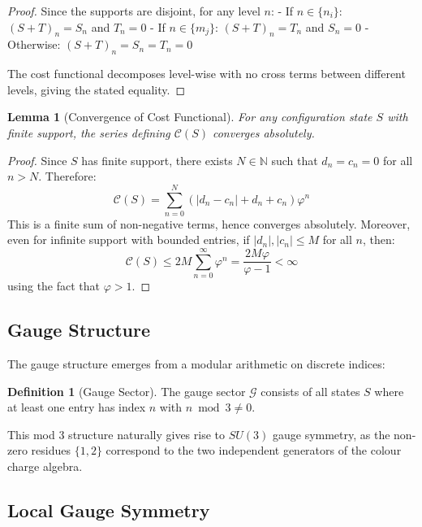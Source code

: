 \documentclass[11pt]{article}
\numberwithin{equation}{section}
\newtheorem{lemma}[theorem]{Lemma}
\theoremstyle{definition}
\newtheorem{definition}[theorem]{Definition}
\theoremstyle{remark}
\begin{document}
\begin{proof}
Since the supports are disjoint, for any level $n$:
- If $n \in \{n_i\}$: $(S+T)_n = S_n$ and $T_n = 0$
- If $n \in \{m_j\}$: $(S+T)_n = T_n$ and $S_n = 0$  
- Otherwise: $(S+T)_n = S_n = T_n = 0$

The cost functional decomposes level-wise with no cross terms between different levels, giving the stated equality.
\end{proof}

\begin{lemma}[Convergence of Cost Functional]
For any configuration state $S$ with finite support, the series defining $\mathcal{C}(S)$ converges absolutely.
\end{lemma}

\begin{proof}
Since $S$ has finite support, there exists $N \in \mathbb{N}$ such that $d_n = c_n = 0$ for all $n > N$. Therefore:
\begin{equation}
\mathcal{C}(S) = \sum_{n=0}^{N} \left(|d_n - c_n| + d_n + c_n\right) \varphi^n
\end{equation}
This is a finite sum of non-negative terms, hence converges absolutely. Moreover, even for infinite support with bounded entries, if $|d_n|, |c_n| \leq M$ for all $n$, then:
\begin{equation}
\mathcal{C}(S) \leq 2M \sum_{n=0}^{\infty} \varphi^n = \frac{2M\varphi}{\varphi - 1} < \infty
\end{equation}
using the fact that $\varphi > 1$.
\end{proof}

\subsection{Gauge Structure}

The gauge structure emerges from a modular arithmetic on discrete indices:

\begin{definition}[Gauge Sector]
The gauge sector $\mathcal{G}$ consists of all states $S$ where at least one entry has index $n$ with $n \bmod 3 \neq 0$.
\end{definition}

This mod 3 structure naturally gives rise to $SU(3)$ gauge symmetry, as the non-zero residues $\{1, 2\}$ correspond to the two independent generators of the colour charge algebra.

\subsection{Local Gauge Symmetry}
\end{document}
